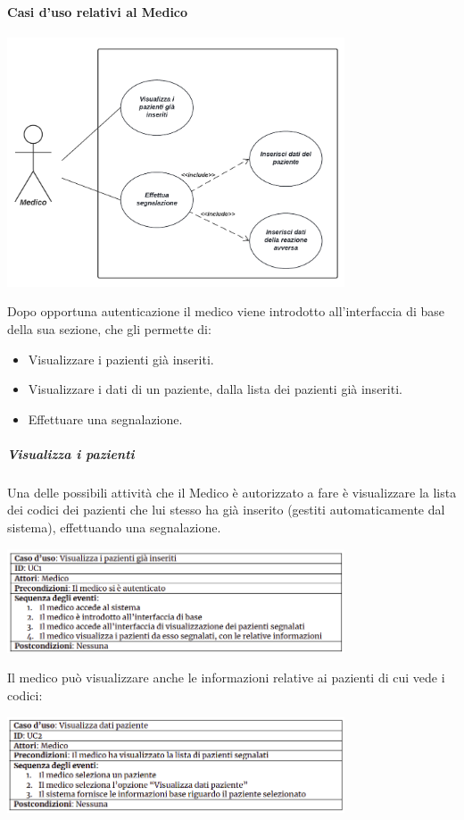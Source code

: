 \documentclass{article}
\begin{document}
\paragraph*{Casi d'uso relativi al Medico}
\begin{center}
    \includegraphics[width=0.75\textwidth]{pictures/CasoDUsoMedico.png}
\end{center}
Dopo opportuna autenticazione il medico viene introdotto all'interfaccia di base della sua sezione, che gli permette di:
\begin{itemize}
    \item Visualizzare i pazienti già inseriti.
    \item Visualizzare i dati di un paziente, dalla lista dei pazienti già inseriti.
    \item Effettuare una segnalazione.
\end{itemize}
\subparagraph*{Visualizza i pazienti}
Una delle possibili attività che il Medico è autorizzato a fare è visualizzare la lista dei codici dei pazienti che lui stesso ha già inserito (gestiti automaticamente dal sistema), effettuando una segnalazione.
\begin{center}
    \includegraphics[width=0.75\textwidth]{pictures/UC1.png}
\end{center}
Il medico può visualizzare anche le informazioni relative ai pazienti di cui vede i codici:
\begin{center}
    \includegraphics[width=0.75\textwidth]{pictures/UC2.png}
\end{center}
\end{document}
